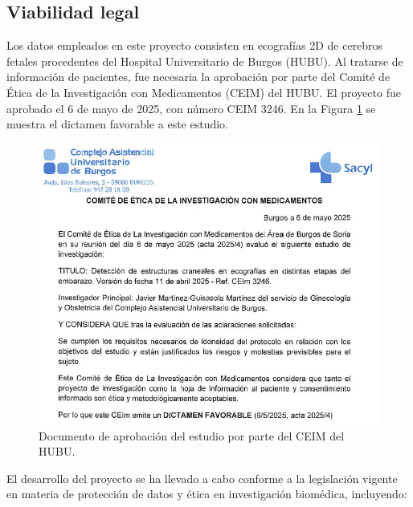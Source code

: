 \subsection{Viabilidad legal}
Los datos empleados en este proyecto consisten en ecografías 2D de cerebros fetales procedentes del Hospital Universitario de Burgos (HUBU). Al tratarse de información de pacientes, fue necesaria la aprobación por parte del  Comité de Ética de la Investigación con Medicamentos (CEIM) del HUBU. El proyecto fue aprobado el 6 de mayo de 2025, con número CEIM 3246. En la Figura \ref{fig:aprobacion_ceim} se muestra el dictamen favorable a este estudio.


\begin{figure}[h]
    \centering
    \includegraphics[width=\textwidth]{img/ceim_aprobacion.png}
    \caption{Documento de aprobación del estudio por parte del CEIM del HUBU.}
    \label{fig:aprobacion_ceim}
\end{figure}


El desarrollo del proyecto se ha llevado a cabo conforme a la legislación vigente en materia de protección de datos y ética en investigación biomédica, incluyendo:

